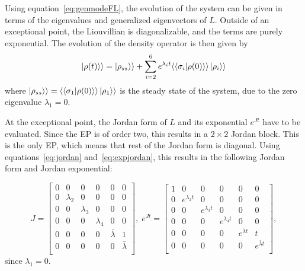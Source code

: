 \documentclass[../main.tex]{subfiles}
\begin{document}
Using equation~\eqref{eq:genmodeFL}, the evolution of the system can be given in terms of the eigenvalues and generalized eigenvectors of $L$. Outside of an exceptional point, the Liouvillian is diagonalizable, and the terms are purely exponential. The evolution of the density operator is then given by
\begin{equation}\label{eq:dynnonep}
    \ket{\rho(t)}\rangle = \ket{\rho_{ss}}\rangle + \sum_{i=2}^6 e^{\lambda_i t} \langle\braket{\sigma_i|\rho(0)}\rangle \ket{\rho_i}\rangle
\end{equation}
where $\ket{\rho_{ss}}\rangle = \langle\braket{\sigma_1|\rho(0)}\rangle \ket{\rho_1}\rangle$ is the steady state of the system, due to the zero eigenvalue $\lambda_1=0$.

At the exceptional point, the Jordan form of $L$ and its exponential $e^{Jt}$ have to be evaluated. Since the EP is of order two, this results in a $2\times2$ Jordan block. This is the only EP, which means that rest of the Jordan form is diagonal. Using equations~\eqref{eq:jordan} and~\eqref{eq:expjordan}, this results in the following Jordan form and Jordan exponential:

\begin{equation}
    J = \begin{bmatrix} 0 & 0 & 0 & 0 & 0 & 0 \\
                        0 & \lambda_2 & 0 & 0 & 0 & 0 \\
                        0 & 0 & \lambda_3 & 0 & 0 & 0 \\
                        0 & 0 & 0 & \lambda_4 & 0 & 0 \\
                        0 & 0 & 0 & 0 & \bar \lambda & 1 \\
                        0 & 0 & 0 & 0 & 0 & \bar \lambda \\ \end{bmatrix}, \; 
        e^{Jt} = \begin{bmatrix} 1 & 0 & 0 & 0 & 0 & 0 \\
            0 & e^{\lambda_2t} & 0 & 0 & 0 & 0 \\
            0 & 0 & e^{\lambda_3t} & 0 & 0 & 0 \\
            0 & 0 & 0 & e^{\lambda_4t} & 0 & 0 \\
            0 & 0 & 0 & 0 & e^{\bar \lambda t} & t \\
        0 & 0 & 0 & 0 & 0 & e^{\bar \lambda t} \\ \end{bmatrix},
\end{equation}
since $\lambda_1 = 0$.
\end{document}
